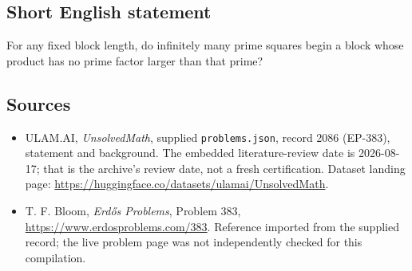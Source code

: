 \documentclass[11pt,a4paper]{article}
\begin{document}
\subsection{Short English statement}

For any fixed block length, do infinitely many prime squares begin a block whose product has no prime factor larger than that prime?

\subsection{Sources}

{\small

\begin{itemize}

\item[\hypertarget{source:2086:1}{S1}] ULAM.AI, \emph{UnsolvedMath}, supplied \texttt{problems.json}, record 2086 (EP-383), statement and background. The embedded literature-review date is 2026-08-17; that is the archive’s review date, not a fresh certification. Dataset landing page: \url{https://huggingface.co/datasets/ulamai/UnsolvedMath}.

\item[\hypertarget{source:2086:2}{S2}] T. F. Bloom, \emph{Erdős Problems}, Problem 383, \url{https://www.erdosproblems.com/383}. Reference imported from the supplied record; the live problem page was not independently checked for this compilation.

\end{itemize}

}

\label{end:2086}
\end{document}
